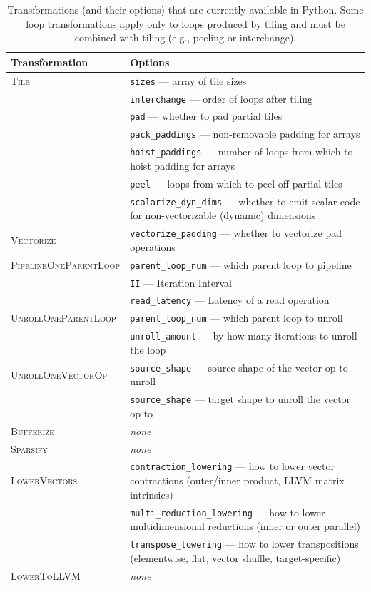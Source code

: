 \begin{table}[h!tb]
    \centering
    \footnotesize
    \begin{tabularx}{\textwidth}{l|X}
    \toprule
    \textbf{Transformation} & \textbf{Options} \\\midrule
    \textsc{Tile} & \texttt{sizes} --- array of tile sizes \\
    ~ & \texttt{interchange} --- order of loops after tiling \\
    ~ & \texttt{pad} --- whether to pad partial tiles\\
    ~ & \texttt{pack\_paddings} --- non-removable padding for arrays\\
    ~ & \texttt{hoist\_paddings} --- number of loops from which to hoist padding for arrays\\
    ~ & \texttt{peel} --- loops from which to peel off partial tiles\\
    ~ & \texttt{scalarize\_dyn\_dims} --- whether to emit scalar code for non-vectorizable (dynamic) dimensions\\
    \hline
    \textsc{Vectorize} & \texttt{vectorize\_padding} --- whether to vectorize pad operations\\
    \hline
    \textsc{PipelineOneParentLoop} & \texttt{parent\_loop\_num} --- which parent loop to pipeline\\
    ~ & \texttt{II} --- Iteration Interval \\
    ~ & \texttt{read\_latency} --- Latency of a read operation \\
    \hline
    \textsc{UnrollOneParentLoop} & \texttt{parent\_loop\_num} --- which parent loop to unroll\\
    ~ & \texttt{unroll\_amount} --- by how many iterations to unroll the loop \\
    \hline
    \textsc{UnrollOneVectorOp} & \texttt{source\_shape} --- source shape of the vector op to unroll\\
    ~ & \texttt{source\_shape} --- target shape to unroll the vector op to \\
    \hline
    \textsc{Bufferize} & \emph{none}\\
    \hline
    \textsc{Sparsify} & \emph{none}\\
    \hline
    \textsc{LowerVectors} & \texttt{contraction\_lowering} --- how to lower vector contractions (outer/inner product, LLVM matrix intrinsics)\\
    ~ & \texttt{multi\_reduction\_lowering} --- how to lower multidimensional reductions (inner or outer parallel)\\
    ~ & \texttt{transpose\_lowering} --- how to lower transpositions (elementwise, flat, vector shuffle, target-specific)\\
    \hline
    \textsc{LowerToLLVM} & \emph{none}\\
    \bottomrule
    \end{tabularx}
    \smallskip
    \caption{\label{tbl:list-of-transformations}Transformations (and their options) that are currently available in Python. Some loop transformations apply only to loops produced by tiling and must be combined with tiling (e.g., peeling or interchange).}


\end{table}
